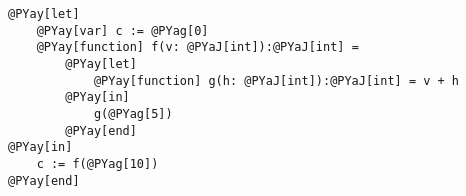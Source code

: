 \begin{Verbatim}[commandchars=@\[\]]
@PYay[let] 
    @PYay[var] c := @PYag[0]
    @PYay[function] f(v: @PYaJ[int]):@PYaJ[int] = 
        @PYay[let] 
            @PYay[function] g(h: @PYaJ[int]):@PYaJ[int] = v + h
        @PYay[in]
            g(@PYag[5])
        @PYay[end]
@PYay[in]
    c := f(@PYag[10])
@PYay[end]
\end{Verbatim}
